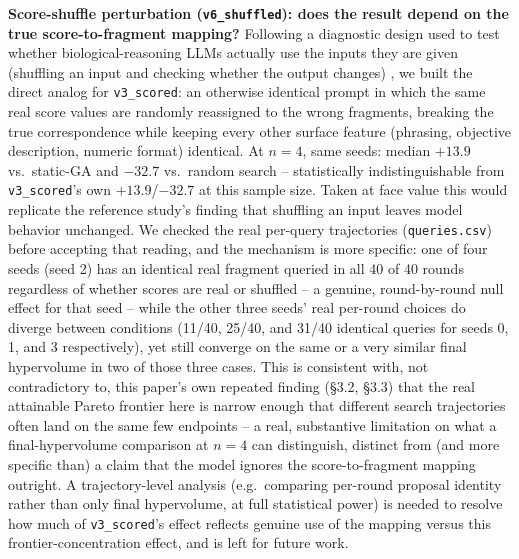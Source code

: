 \documentclass{article}
\begin{document}
\textbf{Score-shuffle perturbation (\texttt{v6\_shuffled}): does the result depend on the true score-to-fragment mapping?} Following a diagnostic design used to test whether biological-reasoning LLMs actually use the inputs they are given (shuffling an input and checking whether the output changes) \citep{fang2026bioreasoninputs}, we built the direct analog for \texttt{v3\_scored}: an otherwise identical prompt in which the same real score values are randomly reassigned to the wrong fragments, breaking the true correspondence while keeping every other surface feature (phrasing, objective description, numeric format) identical. At $n=4$, same seeds: median $+13.9$ vs.\ static-GA and $-32.7$ vs.\ random search -- statistically indistinguishable from \texttt{v3\_scored}'s own $+13.9$/$-32.7$ at this sample size. Taken at face value this would replicate the reference study's finding that shuffling an input leaves model behavior unchanged. We checked the real per-query trajectories (\texttt{queries.csv}) before accepting that reading, and the mechanism is more specific: one of four seeds (seed 2) has an identical real fragment queried in all 40 of 40 rounds regardless of whether scores are real or shuffled -- a genuine, round-by-round null effect for that seed -- while the other three seeds' real per-round choices do diverge between conditions (11/40, 25/40, and 31/40 identical queries for seeds 0, 1, and 3 respectively), yet still converge on the same or a very similar final hypervolume in two of those three cases. This is consistent with, not contradictory to, this paper's own repeated finding (\S3.2, \S3.3) that the real attainable Pareto frontier here is narrow enough that different search trajectories often land on the same few endpoints -- a real, substantive limitation on what a final-hypervolume comparison at $n=4$ can distinguish, distinct from (and more specific than) a claim that the model ignores the score-to-fragment mapping outright. A trajectory-level analysis (e.g.\ comparing per-round proposal identity rather than only final hypervolume, at full statistical power) is needed to resolve how much of \texttt{v3\_scored}'s effect reflects genuine use of the mapping versus this frontier-concentration effect, and is left for future work.
\end{document}
